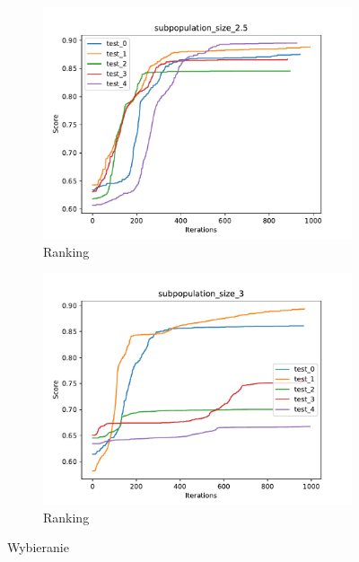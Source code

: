 \begin{figure}[H]
\begin{subfigure}[b]{0.49\linewidth}
        \includegraphics[width=\linewidth]{img/subpopulation_size_2.5.pdf}
        \caption{Ranking}
    \end{subfigure}
    \begin{subfigure}[b]{0.49\linewidth}
        \includegraphics[width=\linewidth]{img/subpopulation_size_3.pdf}
        \caption{Ranking}
    \end{subfigure}
    \caption{Wybieranie}
    \label{fig:picking}
\end{figure}


